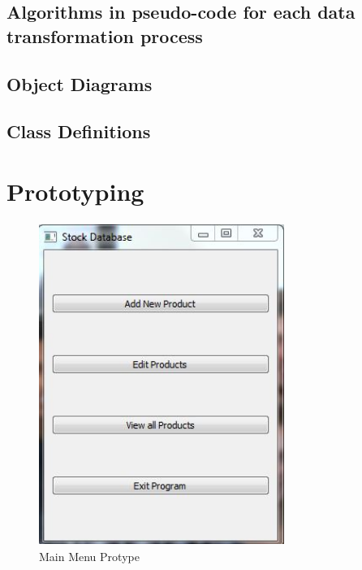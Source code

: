 \subsection{Algorithms in pseudo-code for each data transformation process}

\subsection{Object Diagrams}

\subsection{Class Definitions}

\section{Prototyping}

\begin{figure}[H]
	\centering
	\includegraphics[width= 8cm, height = 10.5cm]{Design/images/menu_prototype.JPG}
	\caption {Main Menu Protype} \label{fig:main_menu_prototype}
\end{figure}

